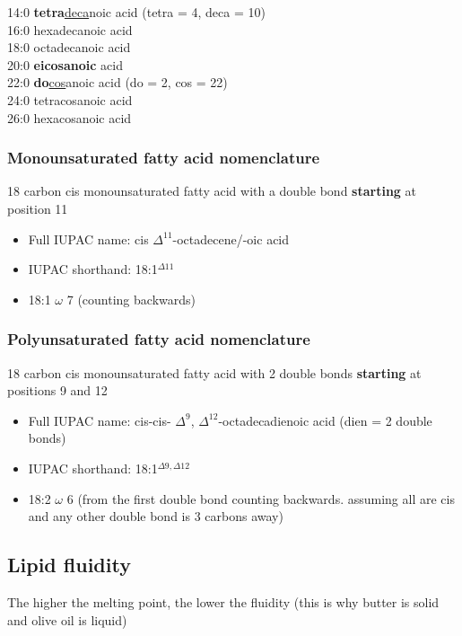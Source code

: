 \documentclass[letterpaper, 12pt]{article}
\begin{document}
14:0 \textbf{tetra}\underline{deca}noic acid (tetra = 4, deca = 10) \\
16:0 hexadecanoic acid \\
18:0 octadecanoic acid \\
20:0 \textbf{eicosanoic} acid \\
22:0 \textbf{do}\underline{cos}anoic acid (do = 2, cos = 22)\\
24:0 tetracosanoic acid \\
26:0 hexacosanoic acid

\subsubsection*{Monounsaturated fatty acid nomenclature}

18 carbon cis monounsaturated fatty acid with a double bond \textbf{starting} at position 11

\begin{itemize}
\item Full IUPAC name: cis $\Delta^{11}$-octadecene/-oic acid
\item IUPAC shorthand: 18:1$^{\Delta 11}$
\item 18:1 $\omega$ 7 (counting backwards)
\end{itemize}

\subsubsection*{Polyunsaturated fatty acid nomenclature}

18 carbon cis monounsaturated fatty acid with 2 double bonds \textbf{starting} at positions 9 and 12
\begin{itemize}
\item Full IUPAC name: cis-cis- $\Delta^{9}$, $\Delta^{12}$-octadecadienoic acid (dien = 2 double bonds)
\item IUPAC shorthand: 18:1$^{\Delta 9, \Delta 12}$
\item 18:2 $\omega$ 6 (from the first double bond counting backwards. assuming all are cis and any other double bond is 3 carbons away)
\end{itemize}

\subsection*{Lipid fluidity}
The higher the melting point, the lower the fluidity (this is why butter is solid and olive oil is liquid)
\end{document}

